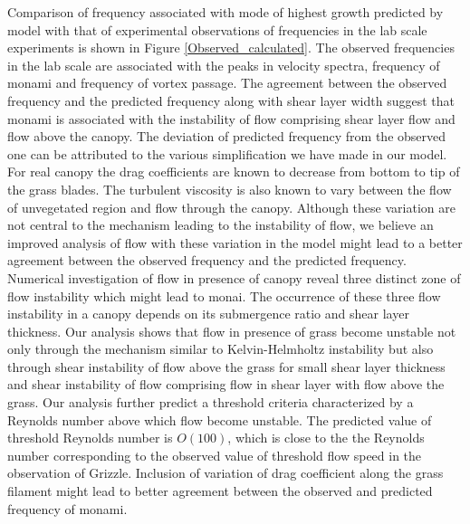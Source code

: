 \documentclass[aps,prl,twocolumn,showpacs,superscriptaddress,groupedaddress,10pt]{revtex4-1}  %
\begin{document}
\newline
Comparison of frequency associated with mode of highest growth predicted by model with that of experimental observations of frequencies in the lab scale experiments is shown in
Figure \ref{Observed_calculated}.
The observed frequencies in the lab scale are associated with the peaks in velocity spectra, frequency of monami and frequency of vortex passage. The agreement between the observed
frequency and the predicted frequency along with shear layer width suggest that monami is associated with the instability of flow comprising shear layer flow and flow above the canopy.
The deviation of predicted frequency from the observed one can be attributed to the various simplification we have made in our model. For real canopy the drag coefficients are known to
decrease from bottom to tip of the grass blades. The turbulent viscosity is also known to vary between the flow of unvegetated region and flow through the canopy. Although these variation
are not central to the mechanism leading to the instability of flow, we believe an improved analysis of flow with these variation in the model might lead to a better agreement between the
observed frequency and the predicted frequency.   
\newline
Numerical investigation of flow in presence of canopy reveal three distinct zone of flow instability which might lead to monai. The occurrence of these three flow instability in a canopy
depends on its submergence ratio and shear layer thickness. Our analysis shows that flow in presence of grass become unstable not only through the mechanism similar to Kelvin-Helmholtz
instability but also through shear instability of flow above the grass for small shear layer thickness and shear instability of flow comprising flow in shear layer with flow above the grass.
Our analysis further predict a threshold criteria characterized by a Reynolds number above which flow become unstable. The predicted value of threshold Reynolds number is $O(100)$, which is 
close to the the Reynolds number corresponding to the observed value of threshold flow speed in the observation of Grizzle. Inclusion of variation of drag coefficient along the grass filament
might lead to better agreement between the observed and predicted frequency of monami. 
\cite{Delangre06}\cite{Delangre04}\cite{Raupach96}\cite{Nepf99}
{}

\end{document}
